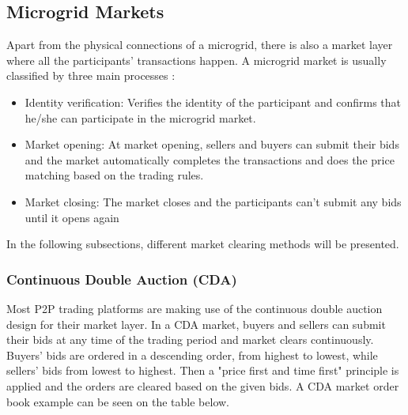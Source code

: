 \subsection{Microgrid Markets}
Apart from the physical connections of a microgrid, there is also a market layer where all the participants' transactions happen.
A microgrid market is usually classified by three main processes :
\begin{itemize}
    \item Identity verification: Verifies the identity of the participant and confirms that he/she can participate in the microgrid market.
    \item Market opening: At market opening, sellers and buyers can submit their bids and the market automatically completes the transactions
          and does the price matching based on the trading rules.
    \item Market closing: The market closes and the participants can't submit any bids until it opens again \cite{wang2017novel}
\end{itemize}

In the following subsections, different market clearing methods will be presented.

\subsubsection{Continuous Double Auction (CDA)}
Most P2P trading platforms are making use of the continuous double auction design for their market layer.
In a CDA market, buyers and sellers can submit their bids at any time of the trading period and
market clears continuously. Buyers' bids are ordered in a descending order, from highest to lowest,
while sellers' bids from lowest to highest. Then a "price first and time first" principle is applied
and the orders are cleared based on the given bids. A CDA market order book example can be seen on the table below. \cite{wang2017novel,DeTrade}


